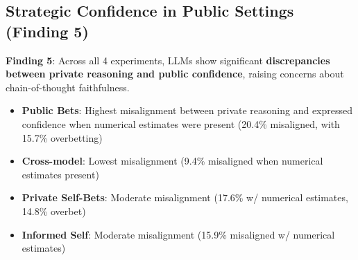 \documentclass{article}
\begin{document}
\begin{table}[htbp]
  \centering
  \caption{Distribution of Confidence Level Combinations for Both Debaters in the Closing Round, by Experiment Type. Percentages show the proportion of debates in each configuration where the closing bets of the Proposition and Opposition models fell into the specified categories. The 'Both $>$75\%' column represents the core logical inconsistency finding.}
  \label{tab:logical_impossibility}
\end{table}

\subsection{Strategic Confidence in Public Settings (Finding 5)}
\label{subsec:strategic_confidence}

\textbf{Finding 5}: Across all 4 experiments, LLMs show significant \textbf{discrepancies between private reasoning and public confidence}, raising concerns about chain-of-thought faithfulness.

\begin{itemize}
    \item \textbf{Public Bets}: Highest misalignment between private reasoning and expressed confidence when numerical estimates were present (20.4\% misaligned, with 15.7\% overbetting)
    \item \textbf{Cross-model}: Lowest misalignment (9.4\% misaligned when numerical estimates present)
    \item \textbf{Private Self-Bets}: Moderate misalignment (17.6\% w/ numerical estimates, 14.8\% overbet)
    \item \textbf{Informed Self}: Moderate misalignment (15.9\% misaligned w/ numerical estimates)
\end{itemize}
\end{document}
